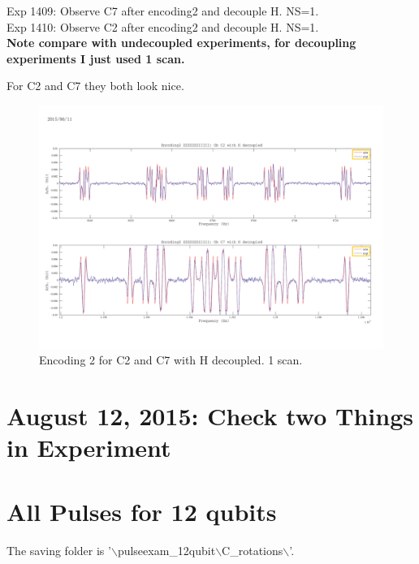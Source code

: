 \documentclass[prl,onecolumn]{revtex4-1}
\newcommand{\dir}{$\backslash$}
\begin{document}
\clearpage
Exp 1409: Observe C7 after encoding2 and decouple H. NS=1.\\
Exp 1410: Observe C2 after encoding2 and decouple H. NS=1.\\
\textbf{Note compare with undecoupled experiments, for decoupling experiments I just used 1 scan.}

For C2 and C7 they both look nice.

\begin{figure}[htb]
\begin{center}
\includegraphics[width=\columnwidth]{Encoding2_with_decouple.pdf}
\end{center}
\setlength{\abovecaptionskip}{-0.35cm}
\caption{\footnotesize{Encoding 2 for C2 and C7 with H decoupled. 1 scan.}}\label{1409and1410}
\end{figure}



\clearpage
\section{August 12, 2015: Check two Things in Experiment}

\clearpage
\section{All Pulses for 12 qubits}

The saving folder is '\dir pulseexam\_12qubit\dir C\_rotations\dir'.
\end{document}
